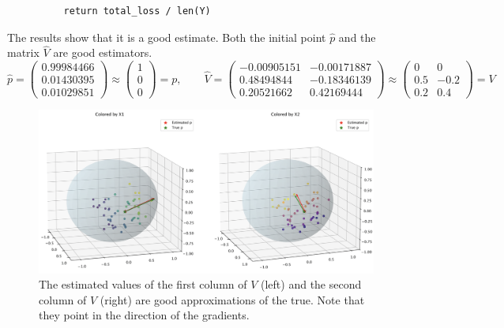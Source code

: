 \begin{example}
\begin{lstlisting}
          return total_loss / len(Y)
    \end{lstlisting}

    The results show that it is a good estimate. Both the initial point $\hat{p}$ and the matrix $\hat{V}$ are good estimators. 
    \begin{equation}
      \hat{p} = \begin{pmatrix} 0.99984466 \\ 0.01430395 \\ 0.01029851 \end{pmatrix} \approx \begin{pmatrix} 1 \\ 0 \\ 0 \end{pmatrix} = p, \qquad \hat{V} =  \begin{pmatrix}
        -0.00905151 & -0.00171887 \\
        0.48494844 & -0.18346139 \\
        0.20521662 & 0.42169444
      \end{pmatrix}
      \approx \begin{pmatrix} 0 & 0 \\ 0.5 & -0.2 \\ 0.2 & 0.4  \end{pmatrix} = V
    \end{equation}

    \begin{figure}[H]
      \centering 
      \includegraphics[scale=0.32]{img/multi_geodesic_est.png}
      \caption{The estimated values of the first column of $V$ (left) and the second column of $V$ (right) are good approximations of the true. Note that they point in the direction of the gradients.} 
    \end{figure}


\end{example}
